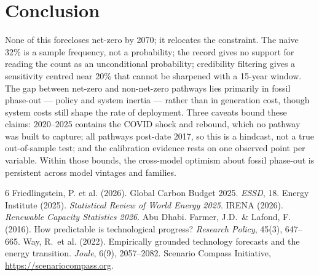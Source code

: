 \documentclass[sigconf, nonacm]{acmart}
\begin{document}
\section{Conclusion}
None of this forecloses net-zero by 2070; it relocates the constraint. The naive 32\% is a sample frequency, not a probability; the record gives no support for reading the count as an unconditional probability; credibility filtering gives a sensitivity centred near 20\% that cannot be sharpened with a 15-year window. The gap between net-zero and non-net-zero pathways lies primarily in fossil phase-out --- policy and system inertia --- rather than in generation cost, though system costs still shape the rate of deployment. Three caveats bound these claims: 2020--2025 contains the COVID shock and rebound, which no pathway was built to capture; all pathways post-date 2017, so this is a hindcast, not a true out-of-sample test; and the calibration evidence rests on one observed point per variable. Within those bounds, the cross-model optimism about fossil phase-out is persistent across model vintages and families.


\begin{thebibliography}{6}
\setlength{\itemsep}{0pt}\setlength{\parsep}{0pt}
 Friedlingstein, P. et al. (2026). Global Carbon Budget 2025. \emph{ESSD}, 18.
 Energy Institute (2025). \emph{Statistical Review of World Energy 2025}.
 IRENA (2026). \emph{Renewable Capacity Statistics 2026}. Abu Dhabi.
 Farmer, J.D.\ \& Lafond, F. (2016). How predictable is technological progress? \emph{Research Policy}, 45(3), 647--665.
 Way, R.\ et al. (2022). Empirically grounded technology forecasts and the energy transition. \emph{Joule}, 6(9), 2057--2082.
 Scenario Compass Initiative, \url{https://scenariocompass.org}.
\end{thebibliography}
\end{document}
